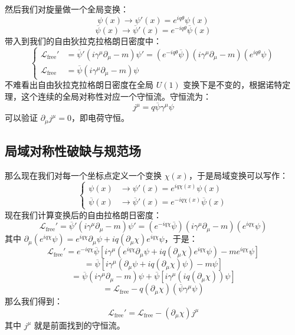 \documentclass[UTF8]{ctexbook}
\begin{document}
然后我们对旋量做一个全局变换：
\[
\psi(x)\to\psi'(x)=e^{iq\theta}\psi(x)
\]
\[
\overline{\psi}(x)\to\overline{\psi}'(x)=e^{-iq\theta}\overline{\psi}(x)
\]
带入到我们的自由狄拉克拉格朗日密度中：
\[
\left\{
\begin{aligned}
\mathcal{L}_{\text{free}}' &= \overline{\psi}'\left( i\gamma^{\mu}\partial_{\mu}-m \right)\psi'
=\left( e^{-iq\theta}\overline{\psi} \right)\left( i\gamma^{\mu}\partial_{\mu}-m \right)\left( e^{iq\theta}\psi \right)\\
\mathcal{L}_{\text{free}} &= \overline{\psi}\left( i\gamma^{\mu}\partial_{\mu}-m \right)\psi
\end{aligned}
\right.
\]
不难看出自由狄拉克拉格朗日密度在全局 $U(1)$ 变换下是不变的，根据诺特定理，这个连续的全局对称性对应一个守恒流。守恒流为：
\[
j^{\mu}=q\overline{\psi}\gamma^{\mu}\psi
\]
可以验证 $\partial_{\mu}j^{\mu}=0$，即电荷守恒。

\subsection{局域对称性破缺与规范场}

那么现在我们对每一个坐标点定义一个变换 $\chi(x)$，于是局域变换可以写作：
\[
\left\{
\begin{aligned}
\psi(x) &\to \psi'(x)=e^{iq\chi(x)}\psi(x)\\
\overline{\psi}(x) &\to \overline{\psi}'(x)=e^{-iq\chi(x)}\overline{\psi}(x)
\end{aligned}
\right.
\]
现在我们计算变换后的自由拉格朗日密度：
\[
\mathcal{L}_{\text{free}}'=\overline{\psi}'\left( i\gamma^{\mu}\partial_{\mu}-m \right)\psi'
=\left( e^{-iq\chi}\overline{\psi} \right)\left( i\gamma^{\mu}\partial_{\mu}-m \right)\left( e^{iq\chi}\psi \right)
\]
其中 $\partial_{\mu}\left( e^{iq\chi}\psi \right)=e^{iq\chi}\partial_{\mu}\psi+iq\left( \partial_{\mu}\chi \right)e^{iq\chi}\psi$，于是：
\[
\mathcal{L}_{\text{free}}'=e^{-iq\chi}\overline{\psi}\left[ i\gamma^{\mu}\left( e^{iq\chi}\partial_{\mu}\psi+iq\left( \partial_{\mu}\chi \right)e^{iq\chi}\psi \right)-me^{iq\chi}\psi \right]
\]
\[
=\overline{\psi}\left[ i\gamma^{\mu}\left( \partial_{\mu}\psi+iq\left( \partial_{\mu}\chi \right)\psi \right)-m\psi \right]
\]
\[
=\overline{\psi}\left( i\gamma^{\mu}\partial_{\mu}-m \right)\psi+\overline{\psi}\left[ i\gamma^{\mu}\left( iq\left( \partial_{\mu}\chi \right) \right)\psi \right]
\]
\[
=\mathcal{L}_{\text{free}}-q\left( \partial_{\mu}\chi \right)\left( \overline{\psi}\gamma^{\mu}\psi \right)
\]
那么我们得到：
\[
\mathcal{L}_{\text{free}}'=\mathcal{L}_{\text{free}}-\left( \partial_{\mu}\chi \right)j^{\mu}
\]
其中 $j^{\mu}$ 就是前面找到的守恒流。
\end{document}
